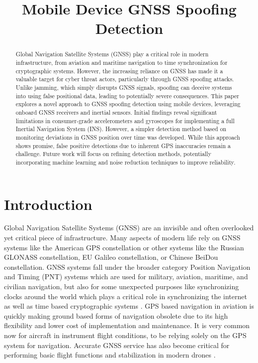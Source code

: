 \documentclass[conference]{IEEEtran}
\title{Mobile Device GNSS Spoofing Detection}
\author{\IEEEauthorblockN{Nathan Johnson}
\IEEEauthorblockA{Cybersecurity Department\\
Embry-Riddle Aeronautical University\\
Prescott, Arizona, USA\\
johnsn63@my.erau.edu}}
\begin{document}
\maketitle

\begin{abstract}
Global Navigation Satellite Systems (GNSS) play a critical role in modern infrastructure, from aviation and maritime navigation to time synchronization for cryptographic systems. However, the increasing reliance on GNSS has made it a valuable target for cyber threat actors, particularly through GNSS spoofing attacks. Unlike jamming, which simply disrupts GNSS signals, spoofing can deceive systems into using false positional data, leading to potentially severe consequences. This paper explores a novel approach to GNSS spoofing detection using mobile devices, leveraging onboard GNSS receivers and inertial sensors. Initial findings reveal significant limitations in consumer-grade accelerometers and gyroscopes for implementing a full Inertial Navigation System (INS). However, a simpler detection method based on monitoring deviations in GNSS position over time was developed. While this approach shows promise, false positive detections due to inherent GPS inaccuracies remain a challenge. Future work will focus on refining detection methods, potentially incorporating machine learning and noise reduction techniques to improve reliability.
\end{abstract}

\section{Introduction}
Global Navigation Satellite Systems (GNSS) are an invisible and often overlooked yet critical piece of infrastructure.  Many aspects of modern life rely on GNSS systems like the American GPS constellation or other systems like the Russian GLONASS constellation, EU Galileo constellation, or Chinese BeiDou constellation.  GNSS systems fall under the broader category Position Navigation and Timing (PNT) systems which are used for military, aviation, maritime, and civilian navigation, but also for some unexpected purposes like synchronizing clocks around the world which plays a critical role in synchronizing the internet as well as time based cryptographic systems \cite{lu2021}. GPS based navigation in aviation is quickly making ground based forms of navigation obsolete due to its high flexibility and lower cost of implementation and maintenance.  It is very common now for aircraft in instrument flight conditions, to be relying solely on the GPS system for navigation. Accurate GNSS service has also become critical for performing basic flight functions and stabilization in modern drones \cite{meng2021}.
\end{document}
